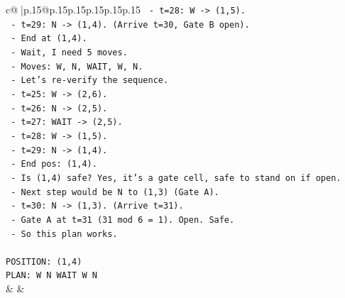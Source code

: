 \documentclass{article}
\begin{document}
{\begin{supertabular}{c@{$\;$}|p{.15\linewidth}@{}p{.15\linewidth}p{.15\linewidth}p{.15\linewidth}p{.15\linewidth}p{.15\linewidth}}
{{{\texttt{  {-} t=28: W {-}> (1,5).} \\
\texttt{  {-} t=29: N {-}> (1,4). (Arrive t=30, Gate B open).} \\
\texttt{  {-} End at (1,4).} \\
\texttt{  {-} Wait, I need 5 moves.} \\
\texttt{  {-} Moves: W, N, WAIT, W, N.} \\
\texttt{  {-} Let's re{-}verify the sequence.} \\
\texttt{  {-} t=25: W {-}> (2,6).} \\
\texttt{  {-} t=26: N {-}> (2,5).} \\
\texttt{  {-} t=27: WAIT {-}> (2,5).} \\
\texttt{  {-} t=28: W {-}> (1,5).} \\
\texttt{  {-} t=29: N {-}> (1,4).} \\
\texttt{  {-} End pos: (1,4).} \\
\texttt{  {-} Is (1,4) safe? Yes, it's a gate cell, safe to stand on if open.} \\
\texttt{  {-} Next step would be N to (1,3) (Gate A).} \\
\texttt{  {-} t=30: N {-}> (1,3). (Arrive t=31).} \\
\texttt{  {-} Gate A at t=31 (31 mod 6 = 1). Open. Safe.} \\
\texttt{  {-} So this plan works.} \\
\\ 
\texttt{POSITION: (1,4)} \\
\texttt{PLAN: W N WAIT W N} \\
            }
        }
    }
    & & \\ \\


\end{supertabular}}
\end{document}
